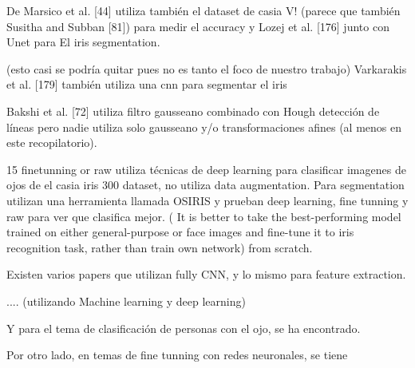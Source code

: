  De Marsico et al. [44] utiliza también el dataset de casia V! (parece que también Susitha and Subban [81]) para medir el accuracy y Lozej et al. [176] junto con Unet para El
 iris segmentation.

(esto casi se podría quitar pues no es tanto el foco de nuestro trabajo) Varkarakis et al. [179] también utiliza una cnn para segmentar el iris

 Bakshi et al. [72] utiliza filtro gausseano combinado con Hough detección de líneas pero nadie utiliza solo gausseano y/o transformaciones afines (al menos en este
 recopilatorio).

 15 finetunning or raw utiliza técnicas de deep learning para clasificar imagenes de ojos de el casia iris 300 dataset, no utiliza data augmentation. Para segmentation utilizan una herramienta
 llamada OSIRIS y prueban deep learning, fine tunning y raw para ver que clasifica mejor. ( It is better to take the best-performing model trained on either general-purpose or face images and
  fine-tune it to iris recognition task, rather than train own network)
 from scratch.
 

 Existen varios papers que utilizan fully CNN, y lo mismo para feature extraction.



.... (utilizando Machine learning y deep learning)

Y para el tema de clasificación de personas con el ojo, se ha encontrado.

Por otro lado, en temas de fine tunning con redes neuronales, se tiene